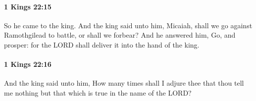 		\paragraph{1 Kings 22:15} %
			\label{1KINGS-22-15}

			So he came to the king. And the king said unto him, Micaiah, shall we go against Ramothgilead to battle, or shall we forbear? And he answered him, Go, and prosper: for the LORD shall deliver it into the hand of the king.


		\paragraph{1 Kings 22:16} %
			\label{1KINGS-22-16}

			And the king said unto him, How many times shall I adjure thee that thou tell me nothing but that which is true in the name of the LORD?


